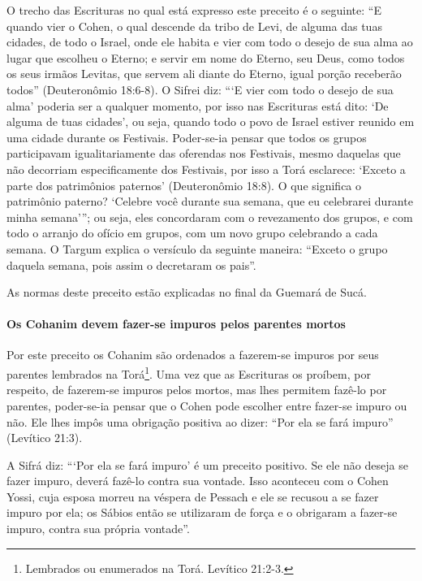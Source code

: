 O trecho das Escrituras no qual está expresso este preceito é o
seguinte: ``E quando vier o Cohen, o qual descende da tribo de Levi,
de alguma das tuas cidades, de todo o Israel, onde ele habita e vier com
todo o desejo de sua alma ao lugar que escolheu o Eterno; e servir em
nome do Eterno, seu Deus, como todos os seus irmãos Levitas, que servem
ali diante do Eterno, igual porção receberão todos'' (Deuteronômio
18:6-8). O Sifrei diz: ```E vier com todo o desejo de sua alma' poderia ser a qualquer momento, por isso nas
Escrituras está dito: `De alguma de tuas cidades', ou seja, quando todo
o povo de Israel estiver reunido em uma cidade durante os Festivais.
Poder-se-ia pensar que todos os grupos participavam igualitariamente das
oferendas nos Festivais, mesmo daquelas que não decorriam
especificamente dos Festivais, por isso a Torá esclarece: `Exceto a
parte dos patrimônios paternos' (Deuteronômio 18:8). O que significa o
patrimônio paterno? `Celebre você durante sua semana, que eu celebrarei
durante minha semana'''; ou seja, eles concordaram com o revezamento
dos grupos, e com todo o arranjo do ofício em grupos, com um novo grupo
celebrando a cada semana. O Targum explica o versículo da seguinte
maneira: ``Exceto o grupo daquela semana, pois assim o decretaram os
pais''.

As normas deste preceito estão explicadas no final da Guemará de Sucá.

\paragraph{Os Cohanim devem fazer-se impuros pelos parentes mortos}

Por este preceito os Cohanim são ordenados a fazerem-se impuros por
seus parentes lembrados na Torá\footnote{Lembrados ou enumerados na Torá. Levítico 21:2-3.}. Uma vez que as
Escrituras os proíbem, por respeito, de fazerem-se impuros pelos
mortos, mas lhes permitem fazê-lo por parentes, poder-se-ia pensar que o
Cohen pode escolher entre fazer-se impuro ou não. Ele lhes impôs uma
obrigação positiva ao dizer: ``Por ela se fará impuro'' (Levítico 21:3).

A Sifrá diz: ```Por ela se fará impuro' é um preceito positivo. Se ele
não deseja se fazer impuro, deverá fazê-lo contra sua vontade. Isso
aconteceu com o Cohen Yossi, cuja esposa morreu na véspera de
Pessach e ele se recusou a se fazer impuro por ela; os Sábios então
se utilizaram de força e o obrigaram a fazer-se impuro, contra sua
própria vontade''.

